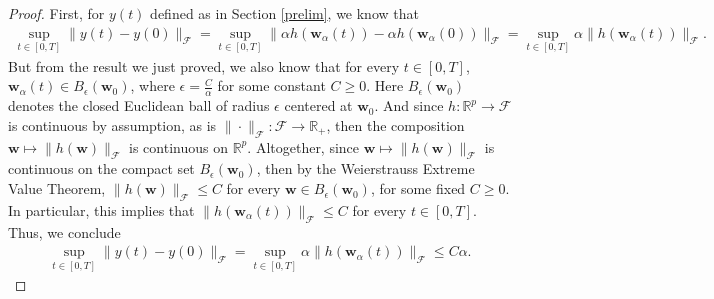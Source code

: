 \documentclass{article}
\begin{document}
\begin{proof}
First, for $y(t)$ defined as in Section \ref{prelim}, we know that
\begin{align*}
    \sup_{t \in [0, T]} \|y(t) - y(0)\|_{\mathcal{F}} = \sup_{t \in [0, T]} \|\alpha h(\boldsymbol{w}_{\alpha}(t)) - \alpha h(\boldsymbol{w}_{\alpha}(0)) \|_{\mathcal{F}} = \sup_{t \in [0, T]} \alpha \| h(\boldsymbol{w}_{\alpha}(t))\|_{\mathcal{F}}.
\end{align*}
But from the result we just proved, we also know that for every $t \in [0, T]$, $\boldsymbol{w}_{\alpha}(t) \in B_{\epsilon}(\boldsymbol{w}_0)$, where $\epsilon = \frac{C}{\alpha}$ for some constant $C \geq 0$. Here $B_{\epsilon}(\boldsymbol{w}_0)$ denotes the closed Euclidean ball of radius $\epsilon$ centered at $\boldsymbol{w}_0$. And since $h: \mathbb{R}^p \rightarrow \mathcal{F}$ is continuous by assumption, as is $\| \cdot \|_{\mathcal{F}}: \mathcal{F} \rightarrow \mathbb{R}_+$, then the composition $\boldsymbol{w} \mapsto \| h(\boldsymbol{w}) \|_{\mathcal{F}}$ is continuous on $\mathbb{R}^p$. Altogether, since $\boldsymbol{w} \mapsto \| h(\boldsymbol{w}) \|_{\mathcal{F}}$ is continuous on the compact set $B_{\epsilon}(\boldsymbol{w}_0)$, then by the Weierstrauss Extreme Value Theorem, $\|h(\boldsymbol{w})\|_{\mathcal{F}} \leq C$ for every $\boldsymbol{w} \in B_{\epsilon}(\boldsymbol{w}_0)$, for some fixed $C \geq 0$. In particular, this implies that $\| h(\boldsymbol{w}_{\alpha}(t)) \|_{\mathcal{F}} \leq C$ for every $t \in [0, T]$. Thus, we conclude
\begin{align*}
    \sup_{t \in [0, T]} \|y(t) - y(0)\|_{\mathcal{F}} = \sup_{t \in [0, T]} \alpha \| h(\boldsymbol{w}_{\alpha}(t))\|_{\mathcal{F}} \leq  C \alpha.
\end{align*}


\end{proof}
\end{document}

